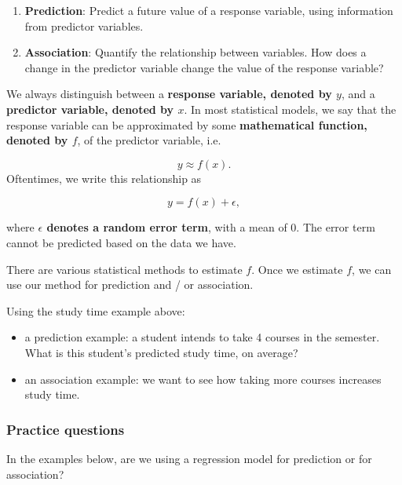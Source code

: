 \documentclass[
]{book}
\providecommand{\tightlist}{%
  \setlength{\itemsep}{0pt}\setlength{\parskip}{0pt}}
\begin{document}
\begin{enumerate}
\def\labelenumi{\arabic{enumi}.}
\tightlist
\item
  \textbf{Prediction}: Predict a future value of a response variable, using information from predictor variables.
\item
  \textbf{Association}: Quantify the relationship between variables. How does a change in the predictor variable change the value of the response variable?
\end{enumerate}

We always distinguish between a \textbf{response variable, denoted by \(y\)}, and a \textbf{predictor variable, denoted by \(x\)}. In most statistical models, we say that the response variable can be approximated by some \textbf{mathematical function, denoted by \(f\)}, of the predictor variable, i.e.

\[
y \approx f(x).
\]
Oftentimes, we write this relationship as

\[
y = f(x) + \epsilon,
\]

where \textbf{\(\epsilon\) denotes a random error term}, with a mean of 0. The error term cannot be predicted based on the data we have.

There are various statistical methods to estimate \(f\). Once we estimate \(f\), we can use our method for prediction and / or association.

Using the study time example above:

\begin{itemize}
\tightlist
\item
  a prediction example: a student intends to take 4 courses in the semester. What is this student's predicted study time, on average?
\item
  an association example: we want to see how taking more courses increases study time.
\end{itemize}

\hypertarget{practice-questions}{%
\subsubsection{Practice questions}\label{practice-questions}}

In the examples below, are we using a regression model for prediction or for association?
\end{document}
